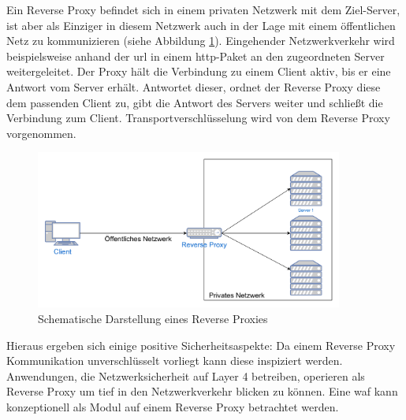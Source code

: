Ein Reverse Proxy befindet sich in einem privaten Netzwerk mit dem Ziel-Server, ist aber als Einziger in diesem Netzwerk auch in der Lage mit einem öffentlichen Netz zu kommunizieren (siehe Abbildung \ref{fig:revprox}).
Eingehender Netzwerkverkehr wird beispielsweise anhand der \ac{url} in einem \ac{http}-Paket an den zugeordneten Server weitergeleitet.
Der Proxy hält die Verbindung zu einem Client aktiv, bis er eine Antwort vom Server erhält.
Antwortet dieser, ordnet der Reverse Proxy diese dem passenden Client zu, gibt die Antwort des Servers weiter und schließt die Verbindung zum Client.
Transportverschlüsselung wird von dem Reverse Proxy vorgenommen.

\begin{figure}[!hbt]
    \centering
    \includegraphics[width=0.9\textwidth]{./images/reverse-Proxy.png}
    \caption{Schematische Darstellung eines Reverse Proxies}
    \label{fig:revprox}
\end{figure}

Hieraus ergeben sich einige positive Sicherheitsaspekte:
Da einem Reverse Proxy Kommunikation unverschlüsselt vorliegt kann diese inspiziert werden.
Anwendungen, die Netzwerksicherheit auf Layer 4 betreiben, operieren als Reverse Proxy um tief in den Netzwerkverkehr blicken zu können.
Eine \ac{waf} kann konzeptionell als Modul auf einem Reverse Proxy betrachtet werden\cite{WasIstReverse}.

\pagebreak